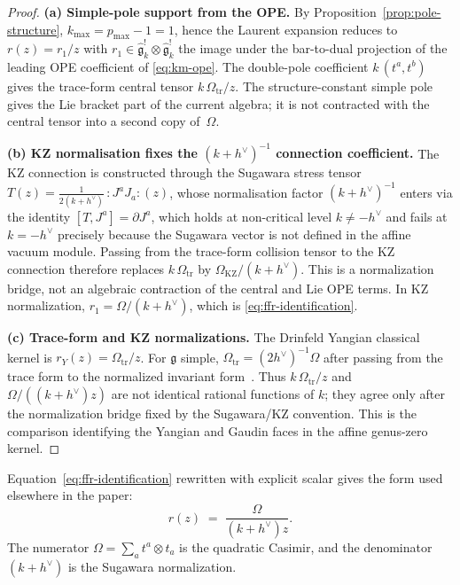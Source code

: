 \documentclass[11pt]{article}
\theoremstyle{plain}
\theoremstyle{definition}
\theoremstyle{remark}
\newcommand{\fg}{\mathfrak{g}}
\numberwithin{equation}{section}
\begin{document}
\begin{proof}
\textbf{(a) Simple-pole support from the OPE.} By
Proposition~\ref{prop:pole-structure}, $k_{\max} = p_{\max} - 1 =
1$, hence the Laurent expansion reduces to $r(z) = r_1/z$ with
$r_1 \in \widehat{\fg}_k^! \otimes \widehat{\fg}_k^!$ the image
under the bar-to-dual projection of the leading OPE coefficient of
\eqref{eq:km-ope}. The double-pole coefficient
$k\,(t^a,t^b)$ gives the trace-form central tensor
$k\,\Omega_{\mathrm{tr}}/z$. The structure-constant simple pole gives
the Lie bracket part of the current algebra; it is not contracted with
the central tensor into a second copy of~$\Omega$.

\textbf{(b) KZ normalisation fixes the $(k+h^\vee)^{-1}$
connection coefficient.} The KZ connection is constructed through the
Sugawara stress tensor
$T(z) = \tfrac{1}{2(k+h^\vee)} \, :J^a J_a:(z)$, whose normalisation
factor $(k+h^\vee)^{-1}$ enters via the identity
$[T, J^a] = \partial J^a$, which holds at non-critical level
$k \neq -h^\vee$ and fails at $k = -h^\vee$ precisely because the
Sugawara vector is not defined in the affine vacuum module. Passing
from the trace-form collision tensor
to the KZ connection therefore replaces
$k\,\Omega_{\mathrm{tr}}$ by $\Omega_{\mathrm{KZ}}/(k+h^\vee)$.
This is a normalization bridge, not an algebraic contraction of the
central and Lie OPE terms. In KZ normalization,
$r_1 = \Omega/(k+h^\vee)$, which is
\eqref{eq:ffr-identification}.

\textbf{(c) Trace-form and KZ normalizations.} The Drinfeld Yangian
classical kernel is \(r_Y(z)=\Omega_{\mathrm{tr}}/z\). For \(\fg\)
simple, \(\Omega_{\mathrm{tr}}=(2h^\vee)^{-1}\Omega\) after passing
from the trace form to the normalized invariant form~\cite[\S6]{Kac1990}.
Thus \(k\,\Omega_{\mathrm{tr}}/z\) and
\(\Omega/((k+h^\vee)z)\) are not identical rational functions of
\(k\); they agree only after the normalization bridge fixed by the
Sugawara/KZ convention. This is the comparison identifying the Yangian
and Gaudin faces in the affine genus-zero kernel.
\end{proof}

Equation~\eqref{eq:ffr-identification} rewritten with explicit
scalar gives the form used elsewhere in the paper:
\begin{equation}\label{eq:km-r-matrix}
 r(z)
 \;=\;
 \frac{\Omega}{(k + h^\vee) z}.
\end{equation}
The numerator $\Omega = \sum_a t^a \otimes t_a$ is the quadratic
Casimir, and the denominator $(k + h^\vee)$ is the Sugawara
normalization.
\end{document}
